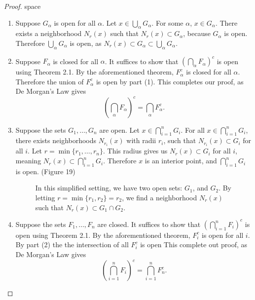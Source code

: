 \documentclass{article}
\theoremstyle{definition}
\begin{document}
\begin{proof}{\color{white}space}
	\begin{enumerate}
		\item Suppose $ G_\alpha $ is open for all $ \alpha $. Let $ x\in \bigcup_\alpha G_\alpha $. For some $ \alpha $, $ x\in G_\alpha $. There exists a neighborhood $ N_r(x) $ such that $ N_r(x)\subset G_\alpha $, because $ G_\alpha $ is open. Therefore $ \bigcup_\alpha G_\alpha $ is open, as $ N_r(x)\subset G_\alpha\subset \bigcup_\alpha G_\alpha $. 
		\item Suppose $ F_\alpha $ is closed for all $ \alpha $. It suffices to show that $ (\bigcap_\alpha F_\alpha)^c $ is open using Theorem 2.1. By the aforementioned theorem, $ F_\alpha^c $ is closed for all $ \alpha $. Therefore the union of $ F_\alpha^c $ is open by part (1). This completes our proof, as De Morgan's Law gives $$ \left(\bigcap_\alpha F_\alpha\right)^c=\bigcap_\alpha F_\alpha^c.$$
		\item Suppose the sets $ G_1,\ldots,G_n $ are open. Let $ x\in \bigcap_{i=1}^n G_i$. For all $ x\in\bigcap_{i=1}^n G_i $, there exists neighborhoods $ N_{r_i}(x) $ with radii $ r_i $, such that $ N_{r_i}(x)\subset G_i $ for all $ i $. Let $ r=\min\{r_1,\ldots,r_n\} $. This radius gives us $ N_r(x)\subset G_i $ for all $ i $, meaning $ N_r(x)\subset \bigcap_{i=1}^n G_i $. Therefore $ x $ is an interior point, and $ \bigcap_{i=1}^n G_i $ is open. (Figure 19)   
		\begin{figure}[h!]
			\centering
			\caption{In this simplified setting, we have two open sets: $ G_1 $, and $ G_2 $. By letting $ r=\min\{r_1,r_2\}=r_2 $, we find a neighborhood $ N_r(x) $ such that $ N_r(x)\subset G_1\cap G_2 $. }
		\end{figure}
		\item  Suppose the sets $ F_1,\ldots,F_n $ are closed. It suffices to show that $ (\bigcap_{i=1}^n F_i)^c $ is open using Theorem 2.1. By the aforementioned theorem, $ F_i^c $ is open for all $ i$. By part (2) the the intersection of all $ F_i^c $ is open This complete out proof, as De Morgan's Law gives 
		 $$ \left(\bigcap_{i=1}^n F_i\right)^c=\bigcap_{i=1}^n F_n^c.$$
	\end{enumerate}
\end{proof}
\end{document}
